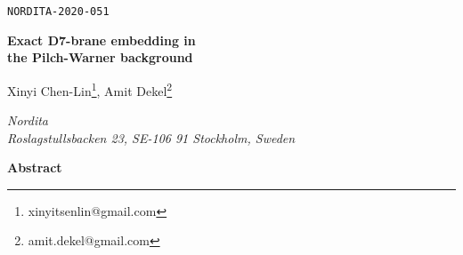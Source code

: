 \documentclass[12pt]{article}
\begin{document}
\begin{flushright}\footnotesize
\texttt{NORDITA-2020-051} \\
\vspace{0.6cm}
\end{flushright}


\begin{center}
{\Large\textbf{ Exact D7-brane embedding in\\ the Pilch-Warner background}
\par}

\vspace{0.8cm}

\textrm{Xinyi Chen-Lin\footnote{xinyitsenlin@gmail.com}, Amit Dekel\footnote{amit.dekel@gmail.com}}
\vspace{4mm}

\textit{Nordita\\
Roslagstullsbacken 23, SE-106 91 Stockholm, Sweden}


\vspace{5mm}

\textbf{Abstract} 
\vspace{5mm}

\begin{minipage}{13cm}

\end{minipage}

\end{center}

\newpage

\tableofcontents















\end{document}
